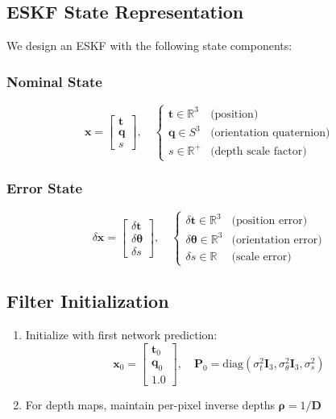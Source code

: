 \subsection{ESKF State Representation}
We design an ESKF with the following state components:

\subsubsection{Nominal State}
\begin{equation}
	\mathbf{x} = \begin{bmatrix}
		\mathbf{t} \\ \mathbf{q} \\ s
	\end{bmatrix}, \quad
	\begin{cases}
		\mathbf{t} \in \mathbb{R}^3 & \text{(position)} \\
		\mathbf{q} \in S^3 & \text{(orientation quaternion)} \\
		s \in \mathbb{R}^+ & \text{(depth scale factor)}
	\end{cases}
\end{equation}

\subsubsection{Error State}
\begin{equation}
	\delta\mathbf{x} = \begin{bmatrix}
		\delta\mathbf{t} \\ \delta\boldsymbol{\theta} \\ \delta s
	\end{bmatrix}, \quad
	\begin{cases}
		\delta\mathbf{t} \in \mathbb{R}^3 & \text{(position error)} \\
		\delta\boldsymbol{\theta} \in \mathbb{R}^3 & \text{(orientation error)} \\
		\delta s \in \mathbb{R} & \text{(scale error)}
	\end{cases}
\end{equation}

\subsection{Filter Initialization}
\begin{enumerate}
	\item Initialize with first network prediction:
	\begin{equation}
		\mathbf{x}_0 = \begin{bmatrix}
			\mathbf{t}_0 \\ \mathbf{q}_0 \\ 1.0
		\end{bmatrix}, \quad \mathbf{P}_0 = \text{diag}(\sigma_t^2\mathbf{I}_3, \sigma_\theta^2\mathbf{I}_3, \sigma_s^2)
	\end{equation}
	
	\item For depth maps, maintain per-pixel inverse depths $\boldsymbol{\rho} = 1/\mathbf{D}$
\end{enumerate}

